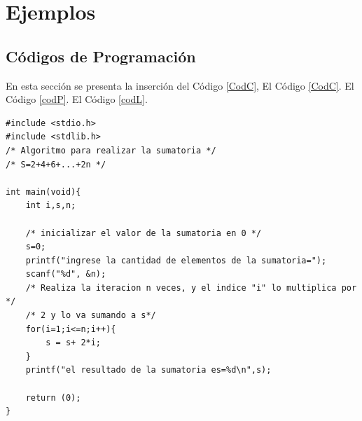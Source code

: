 
\newpage
\section{Ejemplos}
\subsection{Códigos de Programación}
En esta sección se presenta la inserción del Código \ref{CodC}, El Código \ref{CodC}. El Código \ref{codP}. El Código \ref{codL}.



\lstset{language=C}
\begin{lstlisting}[caption = C\'odigo en C de una sumatoria, label = CodC]
#include <stdio.h>
#include <stdlib.h>
/* Algoritmo para realizar la sumatoria */
/* S=2+4+6+...+2n */

int main(void){
	int i,s,n;

	/* inicializar el valor de la sumatoria en 0 */
	s=0;
	printf("ingrese la cantidad de elementos de la sumatoria=");
	scanf("%d", &n);
	/* Realiza la iteracion n veces, y el indice "i" lo multiplica por */
	/* 2 y lo va sumando a s*/
	for(i=1;i<=n;i++){
		s = s+ 2*i;
	}
	printf("el resultado de la sumatoria es=%d\n",s);

	return (0);
}
\end{lstlisting}

